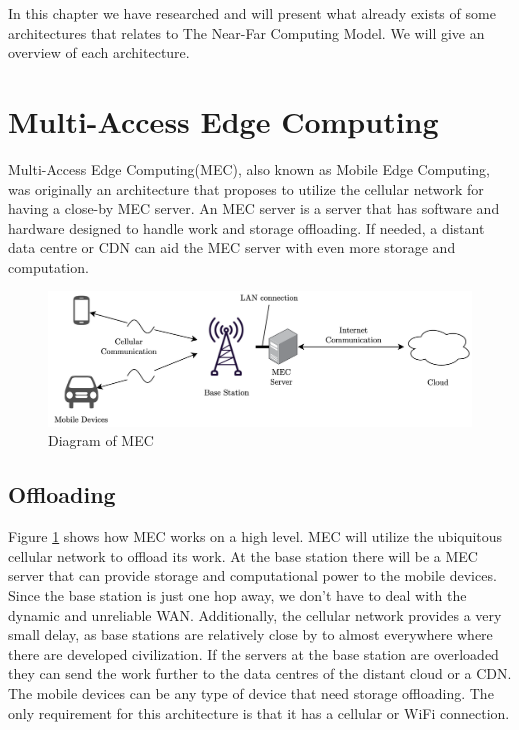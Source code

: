 
In this chapter we have researched and will present what already exists of some architectures that relates to The Near-Far Computing Model. We will give an overview of each architecture.




\section{Multi-Access Edge Computing}\label{section:MEC_architecture}
Multi-Access Edge Computing(MEC), also known as Mobile Edge Computing, was originally an architecture that proposes to utilize the cellular network for having a close-by MEC server\cite{porambage_survey_2018}. An MEC server is a server that has software and hardware designed to handle work and storage offloading. If needed, a distant data centre or CDN can aid the MEC server with even more storage and computation.
\begin{figure}[t]
    \centering
    \includegraphics[scale=0.75]{chapters/4_architectures/figures/MEC.png}
    \caption{Diagram of MEC}
    \label{fig:MEC}
\end{figure}

\subsection{Offloading}
Figure \ref{fig:MEC} shows how MEC works on a high level. MEC will utilize the ubiquitous cellular network to offload its work. At the base station there will be a MEC server that can provide storage and computational power to the mobile devices. Since the base station is just one hop away, we don't have to deal with the dynamic and unreliable WAN. Additionally, the cellular network provides a very small delay, as base stations are relatively close by to almost everywhere where there are developed civilization. If the servers at the base station are overloaded they can send the work further to the data centres of the distant cloud or a CDN. The mobile devices can be any type of device that need storage offloading. The only requirement for this architecture is that it has a cellular or WiFi connection.


